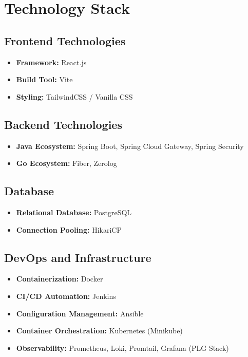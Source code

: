 \documentclass[12pt,a4paper]{report}
\begin{document}
\chapter{Technology Stack}

\section{Frontend Technologies}
\begin{itemize}
    \item \textbf{Framework:} React.js
    \item \textbf{Build Tool:} Vite
    \item \textbf{Styling:} TailwindCSS / Vanilla CSS
\end{itemize}

\section{Backend Technologies}
\begin{itemize}
    \item \textbf{Java Ecosystem:} Spring Boot, Spring Cloud Gateway, Spring Security
    \item \textbf{Go Ecosystem:} Fiber, Zerolog
\end{itemize}

\section{Database}
\begin{itemize}
    \item \textbf{Relational Database:} PostgreSQL
    \item \textbf{Connection Pooling:} HikariCP
\end{itemize}

\section{DevOps and Infrastructure}
\begin{itemize}
    \item \textbf{Containerization:} Docker
    \item \textbf{CI/CD Automation:} Jenkins
    \item \textbf{Configuration Management:} Ansible
    \item \textbf{Container Orchestration:} Kubernetes (Minikube)
    \item \textbf{Observability:} Prometheus, Loki, Promtail, Grafana (PLG Stack)
\end{itemize}
\end{document}
